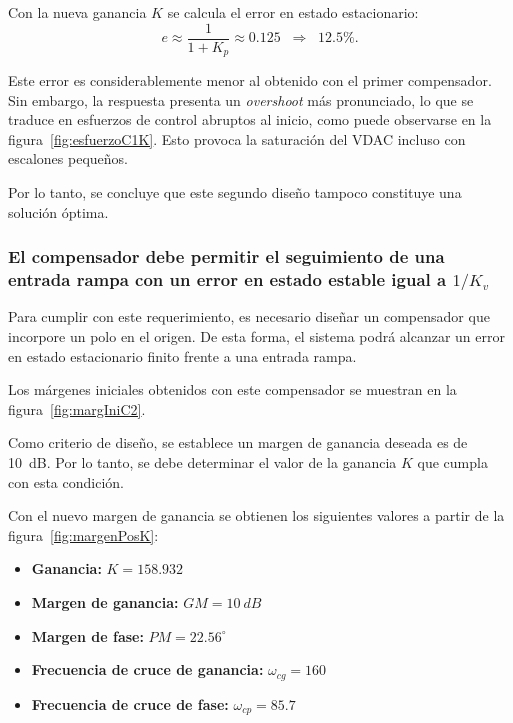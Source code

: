 

Con la nueva ganancia $K$ se calcula el error en estado estacionario:
\[
e \approx \frac{1}{1+K_p} \approx 0.125 \;\; \Rightarrow \;\; 12.5\%.
\]

Este error es considerablemente menor al obtenido con el primer compensador. Sin embargo, la respuesta presenta un \emph{overshoot} más pronunciado, lo que se traduce en esfuerzos de control abruptos al inicio, como puede observarse en la figura~\ref{fig:esfuerzoC1K}. Esto provoca la saturación del VDAC incluso con escalones pequeños.  

Por lo tanto, se concluye que este segundo diseño tampoco constituye una solución óptima.

\subsubsection{El compensador debe permitir el seguimiento de una entrada rampa con un error en estado estable igual a $1/K_v$}

Para cumplir con este requerimiento, es necesario diseñar un compensador que incorpore un polo en el origen. De esta forma, el sistema podrá alcanzar un error en estado estacionario finito frente a una entrada rampa.  

Los márgenes iniciales obtenidos con este compensador se muestran en la figura~\ref{fig:margIniC2}.  


Como criterio de diseño, se establece un margen de ganancia deseada es de \SI{10}{dB}. Por lo tanto, se debe determinar el valor de la ganancia $K$ que cumpla con esta condición.


Con el nuevo margen de ganancia se obtienen los siguientes valores a partir de la figura~\ref{fig:margenPosK}:
\begin{itemize}
	\item \textbf{Ganancia:} $K = 158.932$
	\item \textbf{Margen de ganancia:} $GM = \SI{10}{dB}$
	\item \textbf{Margen de fase:} $PM = 22.56^\circ$
	\item \textbf{Frecuencia de cruce de ganancia:} $\omega_{cg} = 160$
	\item \textbf{Frecuencia de cruce de fase:} $\omega_{cp} = 85.7$
\end{itemize}

